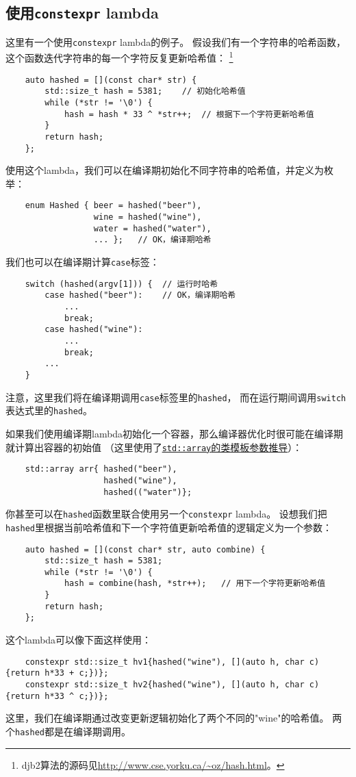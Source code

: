 \subsection{使用\texttt{constexpr} lambda}
这里有一个使用\texttt{constexpr} lambda的例子。
假设我们有一个字符串的哈希函数，这个函数迭代字符串的每一个字符反复更新哈希值：
\footnote{djb2算法的源码见\url{http://www.cse.yorku.ca/~oz/hash.html}。}
\begin{lstlisting}
    auto hashed = [](const char* str) {
        std::size_t hash = 5381;    // 初始化哈希值
        while (*str != '\0') {
            hash = hash * 33 ^ *str++;  // 根据下一个字符更新哈希值
        }
        return hash;
    };
\end{lstlisting}
使用这个lambda，我们可以在编译期初始化不同字符串的哈希值，并定义为枚举：
\begin{lstlisting}
    enum Hashed { beer = hashed("beer"),
                  wine = hashed("wine"),
                  water = hashed("water"),
                  ... };   // OK，编译期哈希
\end{lstlisting}
我们也可以在编译期计算\texttt{case}标签：
\begin{lstlisting}
    switch (hashed(argv[1])) {  // 运行时哈希
        case hashed("beer"):    // OK，编译期哈希
            ...
            break;
        case hashed("wine"):
            ...
            break;
        ...
    }
\end{lstlisting}
注意，这里我们将在编译期调用\texttt{case}标签里的\texttt{hashed}，
而在运行期间调用\texttt{switch}表达式里的\texttt{hashed}。

如果我们使用编译期lambda初始化一个容器，那么编译器优化时很可能在编译期就计算出容器的初始值
（这里使用了\hyperref[ch9.2.6.3]{\texttt{std::array}的类模板参数推导}）：
\begin{lstlisting}
    std::array arr{ hashed("beer"),
                    hashed("wine"),
                    hashed(("water")};
\end{lstlisting}
你甚至可以在\texttt{hashed}函数里联合使用另一个\texttt{constexpr} lambda。
设想我们把\texttt{hashed}里根据当前哈希值和下一个字符值更新哈希值的逻辑定义为一个参数：
\begin{lstlisting}
    auto hashed = [](const char* str, auto combine) {
        std::size_t hash = 5381;
        while (*str != '\0') {
            hash = combine(hash, *str++);   // 用下一个字符更新哈希值
        }
        return hash;
    };
\end{lstlisting}
这个lambda可以像下面这样使用：
\begin{lstlisting}
    constexpr std::size_t hv1{hashed("wine"), [](auto h, char c) {return h*33 + c;})};
    constexpr std::size_t hv2{hashed("wine"), [](auto h, char c) {return h*33 ^ c;})};
\end{lstlisting}
这里，我们在编译期通过改变更新逻辑初始化了两个不同的"wine"的哈希值。
两个\texttt{hashed}都是在编译期调用。


